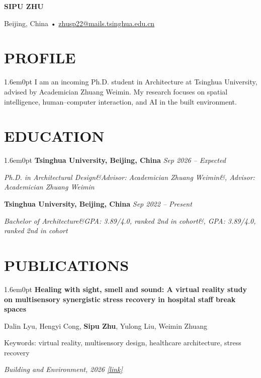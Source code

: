 \documentclass[11.5pt,letterpaper]{article}
\newlength{\ItemGap}
\newcommand{\cvname}[1]{\begin{center}{\Large\bfseries #1}\end{center}}
\newcommand{\cvcontact}[1]{\begin{center}\small #1\end{center}}
\newenvironment{cvcontent}
  {\begin{adjustwidth}{1.6em}{0pt}}
  {\end{adjustwidth}}
\newcommand{\entry}[4]{%
  \textbf{#1} \hfill \textit{#2}\par
  \textit{#3\ifx&#4&\else, #4\fi}\par
  \vspace{\ItemGap}
}
\newcommand{\publication}[3]{%
  \textbf{#1}\par
  #2\par
  #3\par
  \vspace{\ItemGap}
}
\begin{document}
\cvname{SIPU ZHU}
\cvcontact{Beijing, China \quad • \quad \href{mailto:zhusp22@mails.tsinghua.edu.cn}{zhusp22@mails.tsinghua.edu.cn}}

\section*{PROFILE}
\begin{cvcontent}
I am an incoming Ph.D. student in Architecture at Tsinghua University, advised by Academician Zhuang Weimin. My research focuses on spatial intelligence, human--computer interaction, and AI in the built environment.
\end{cvcontent}

\section*{EDUCATION}
\begin{cvcontent}
\entry
{Tsinghua University, Beijing, China}
{Sep 2026 -- Expected}
{Ph.D. in Architectural Design}
{Advisor: Academician Zhuang Weimin}

\entry
{Tsinghua University, Beijing, China}
{Sep 2022 -- Present}
{Bachelor of Architecture}
{GPA: 3.89/4.0, ranked 2nd in cohort}
\end{cvcontent}

\section*{PUBLICATIONS}
\begin{cvcontent}
\publication
{Healing with sight, smell and sound: A virtual reality study on multisensory synergistic stress recovery in hospital staff break spaces}
{Dalin Lyu, Hengyi Cong, \textbf{Sipu Zhu}, Yulong Liu, Weimin Zhuang}
{Keywords: virtual reality, multisensory design, healthcare architecture, stress recovery\par
\textit{Building and Environment, 2026 \quad \href{https://doi.org/10.1016/j.buildenv.2026.114587}{[link]}}}
\end{cvcontent}

\end{document}
